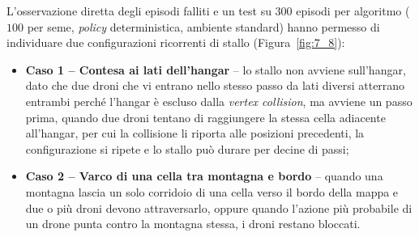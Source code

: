 \documentclass[12pt,a4paper,twoside]{report}
\begin{document}
L'osservazione diretta degli episodi falliti e un test su $300$ episodi per algoritmo ($100$ per seme, \emph{policy} deterministica, ambiente standard) hanno permesso di individuare due configurazioni ricorrenti di stallo (Figura~\ref{fig:7_8}):
\begin{itemize}
    \item \textbf{Caso 1 -- Contesa ai lati dell'hangar} -- lo stallo non avviene sull'hangar, dato che due droni che vi entrano nello stesso passo da lati diversi atterrano entrambi perché l'hangar è escluso dalla \emph{vertex collision}, ma avviene un passo prima, quando due droni tentano di raggiungere la stessa cella adiacente all'hangar, per cui la collisione li riporta alle posizioni precedenti, la configurazione si ripete e lo stallo può durare per decine di passi;
    \item \textbf{Caso 2 -- Varco di una cella tra montagna e bordo} -- quando una montagna lascia un solo corridoio di una cella verso il bordo della mappa e due o più droni devono attraversarlo, oppure quando l'azione più probabile di un drone punta contro la montagna stessa, i droni restano bloccati.
\end{itemize}
\end{document}
